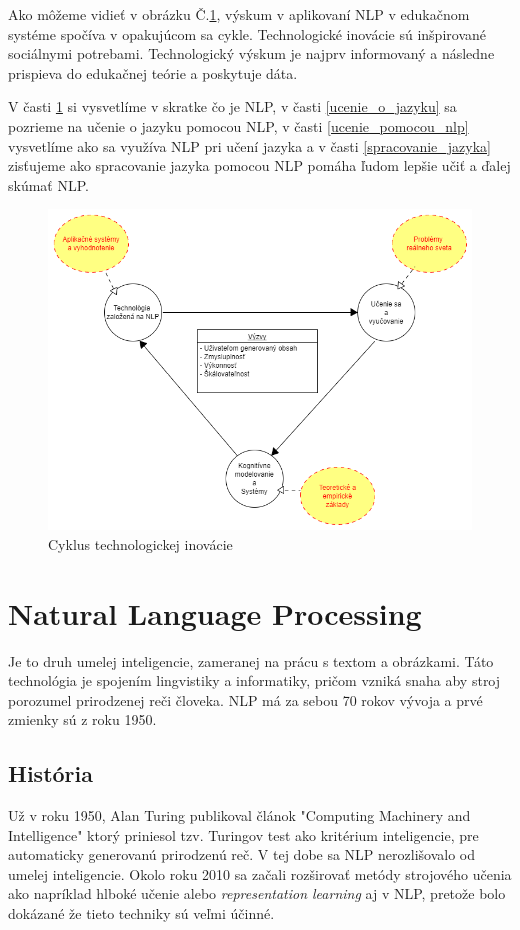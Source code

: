 \documentclass[10pt,slovak,a4paper,twoside]{article}
\begin{document}
Ako môžeme vidieť v obrázku Č.\ref{nlp_obrazok}, výskum v aplikovaní NLP v edukačnom systéme spočíva v opakujúcom sa cykle. 
Technologické inovácie sú inšpirované sociálnymi potrebami. Technologický výskum je najprv informovaný a následne prispieva 
do edukačnej teórie a poskytuje dáta.

V časti \ref{NLP} si vysvetlíme v skratke čo je NLP, v časti \ref{ucenie_o_jazyku} sa pozrieme na učenie o jazyku pomocou NLP, 
v časti \ref{ucenie_pomocou_nlp} vysvetlíme ako sa využíva NLP pri učení jazyka a v časti \ref{spracovanie_jazyka} zisťujeme ako 
spracovanie jazyka pomocou NLP pomáha ľudom lepšie učiť a ďalej skúmať NLP.

\begin{framed}
	\begin{figure}[H]\label{nlp_obrazok}
		\includegraphics{nlp}
		\centering
		\caption{Cyklus technologickej inovácie}
	\end{figure}
\end{framed}
\section{Natural Language Processing} \label{NLP}
Je to druh umelej inteligencie, zameranej na prácu s textom a obrázkami.  
Táto technológia je spojením lingvistiky a informatiky, 
pričom vzniká snaha aby stroj porozumel prirodzenej reči človeka.
NLP má za sebou 70 rokov vývoja a prvé zmienky sú z roku 1950\cite{historia}.
\subsection{História}
	Už v roku 1950, Alan Turing publikoval článok "Computing Machinery and Intelligence"\cite{turing2009computing} 
	ktorý priniesol tzv. Turingov test ako kritérium inteligencie, pre automaticky generovanú 
	prirodzenú reč. V tej dobe sa NLP nerozlišovalo od umelej inteligencie.\linebreak
	Okolo roku 2010 sa začali rozširovať metódy strojového učenia ako napríklad hlboké učenie alebo 
	\textit{representation learning} aj v NLP, pretože bolo dokázané že tieto techniky sú veľmi účinné.
\end{document}
